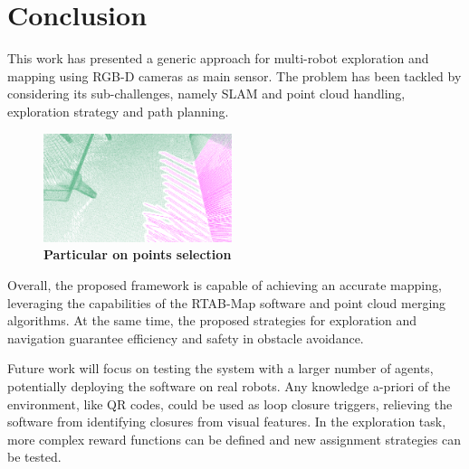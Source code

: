 \section{Conclusion}
\label{sec:conclusion}
This work has presented a generic approach for multi-robot exploration and mapping using RGB-D cameras as main sensor. The problem has been tackled by considering its sub-challenges, namely SLAM and point cloud handling, exploration strategy and path planning.

\begin{figure}[H]
  \begin{center}
    \includegraphics[width=0.49\textwidth]{img/example.png}
  \end{center}
  \caption[]{
    \textbf{Particular on points selection} 
  }
  \label{fig:example}
\end{figure}


Overall, the proposed framework is capable of achieving an accurate mapping, leveraging the capabilities of the RTAB-Map software and point cloud merging algorithms. At the same time, the proposed strategies for exploration and navigation guarantee efficiency and safety in obstacle avoidance.

Future work will focus on testing the system with a larger number of agents, potentially deploying the software on real robots. Any knowledge a-priori of the environment, like QR codes, could be used as loop closure triggers, relieving the software from identifying closures from visual features. In the exploration task, more complex reward functions can be defined and new assignment strategies can be tested. 



